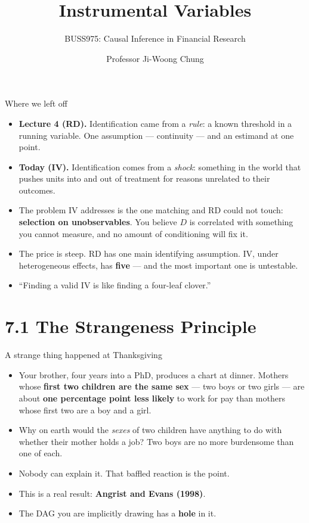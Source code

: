 \documentclass[
  11pt,
  ignorenonframetext,
  aspectratio=169,
]{beamer}
\title{\texorpdfstring{Instrumental Variables}{Instrumental Variables}}
\subtitle{\texorpdfstring{BUSS975: Causal Inference in Financial
Research}{BUSS975: Causal Inference in Financial Research}}
\author{Professor Ji-Woong Chung}
\date{}
\institute{Korea University}
\providecommand{\tightlist}{%
  \setlength{\itemsep}{0pt}\setlength{\parskip}{0pt}}
\begin{document}
\frame{\titlepage}


\begin{frame}{Where we left off}
\protect{}\label{where-we-left-off}
\begin{itemize}
\tightlist
\item
  \textbf{Lecture 4 (RD).} Identification came from a \emph{rule}: a
  known threshold in a running variable. One assumption --- continuity
  --- and an estimand at one point.
\item
  \textbf{Today (IV).} Identification comes from a \emph{shock}:
  something in the world that pushes units into and out of treatment for
  reasons unrelated to their outcomes.
\item
  The problem IV addresses is the one matching and RD could not touch:
  \textbf{selection on unobservables}. You believe \(D\) is correlated
  with something you cannot measure, and no amount of conditioning will
  fix it.
\item
  The price is steep. RD has one main identifying assumption. IV, under
  heterogeneous effects, has \textbf{five} --- and the most important
  one is untestable.
\item
  ``Finding a valid IV is like finding a four-leaf clover.''
\end{itemize}
\end{frame}

\section{7.1 The Strangeness Principle}\label{the-strangeness-principle}

\begin{frame}{A strange thing happened at Thanksgiving}
\protect{}\label{a-strange-thing-happened-at-thanksgiving}
\begin{itemize}
\tightlist
\item
  Your brother, four years into a PhD, produces a chart at dinner.
  Mothers whose \textbf{first two children are the same sex} --- two
  boys or two girls --- are about \textbf{one percentage point less
  likely} to work for pay than mothers whose first two are a boy and a
  girl.
\item
  Why on earth would the \emph{sexes} of two children have anything to
  do with whether their mother holds a job? Two boys are no more
  burdensome than one of each.
\item
  Nobody can explain it. That baffled reaction is the point.
\item
  This is a real result: \textbf{Angrist and Evans (1998)}.
\end{itemize}

\vspace{0.4em}

\begin{itemize}
\tightlist
\item
  The DAG you are implicitly drawing has a \textbf{hole} in it.
\end{itemize}
\end{frame}
\end{document}
